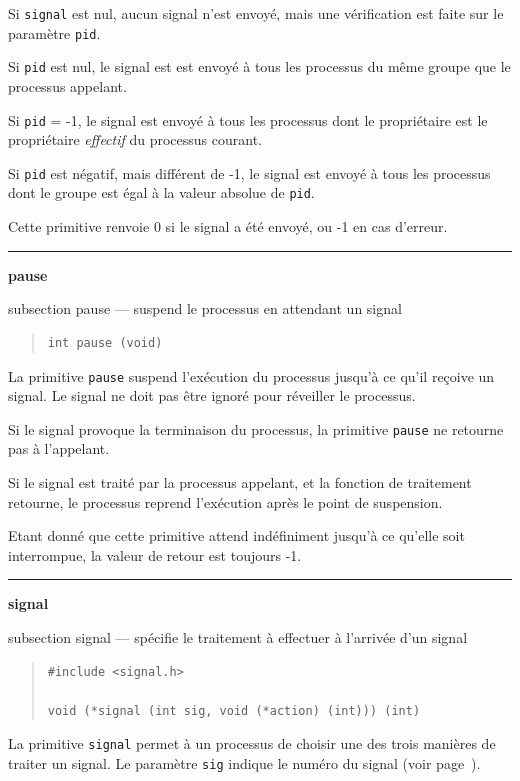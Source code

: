\documentclass [twoside] {report}
\newcommand {\primitive} [1]
    {
	\phantomsection
	{\large \textbf {#1}}
	\addcontentsline {toc} {subsection} {#1}
    }
\newcommand {\separation}
    {
	\vspace {5mm}
	\nopagebreak
	\hrule
    }
\begin{document}
Si \texttt {signal} est nul, aucun signal n'est envoyé,
mais une vérification est faite
sur le paramètre \texttt {pid}.

Si \texttt {pid} est nul, le signal est est envoyé à tous
les processus du même groupe que le processus
appelant.

Si \texttt {pid} = -1, le signal est envoyé à tous les
processus dont le propriétaire est le propriétaire
\textit {effectif} du processus courant.

Si \texttt {pid} est négatif, mais différent de -1, le
signal est envoyé à tous les processus dont le
groupe est égal à la valeur absolue de \texttt {pid}.

Cette primitive renvoie 0 si le signal a été
envoyé, ou -1 en cas d'erreur.




\separation
\primitive {pause} --- suspend le processus en attendant un signal

\begin {quote}
\begin {verbatim}
int pause (void)
\end{verbatim}
\end {quote}

La primitive \texttt {pause} suspend l'exécution du
processus jusqu'à ce qu'il reçoive un signal. Le
signal ne doit pas être ignoré pour réveiller le
processus.

Si le signal provoque la terminaison du
processus, la primitive \texttt {pause} ne retourne pas à
l'appelant.

Si le signal est traité par la processus
appelant, et la fonction de traitement retourne,
le processus reprend l'exécution après le point de
suspension.

Etant donné que cette primitive attend indéfiniment jusqu'à
ce qu'elle soit interrompue, la valeur de retour est toujours -1.



\separation
\primitive {signal} --- spécifie le traitement à effectuer à l'arrivée d'un signal

\begin {quote}
\begin {verbatim}
#include <signal.h>

void (*signal (int sig, void (*action) (int))) (int)
\end{verbatim}
\end {quote}

La primitive \texttt {signal} permet à un processus de
choisir une des trois manières de traiter un
signal. Le paramètre \texttt {sig} indique le numéro
du signal (voir page~\pageref {ps:sigv7}).
\end{document}
